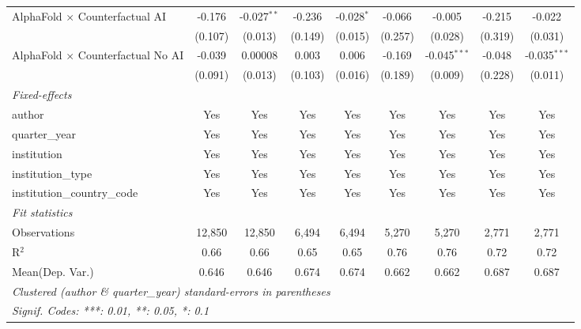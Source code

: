 \begin{tabular}{lcccccccc}
   AlphaFold $\times$ Counterfactual AI     & -0.176  & -0.027$^{**}$ & -0.236  & -0.028$^{*}$ & -0.066  & -0.005         & -0.215  & -0.022\\   
                                            & (0.107) & (0.013)       & (0.149) & (0.015)      & (0.257) & (0.028)        & (0.319) & (0.031)\\   
   AlphaFold $\times$ Counterfactual No AI  & -0.039  & 0.00008       & 0.003   & 0.006        & -0.169  & -0.045$^{***}$ & -0.048  & -0.035$^{***}$\\   
                                            & (0.091) & (0.013)       & (0.103) & (0.016)      & (0.189) & (0.009)        & (0.228) & (0.011)\\   
   \midrule
   \emph{Fixed-effects}\\
   author                                   & Yes     & Yes           & Yes     & Yes          & Yes     & Yes            & Yes     & Yes\\  
   quarter\_year                            & Yes     & Yes           & Yes     & Yes          & Yes     & Yes            & Yes     & Yes\\  
   institution                              & Yes     & Yes           & Yes     & Yes          & Yes     & Yes            & Yes     & Yes\\  
   institution\_type                        & Yes     & Yes           & Yes     & Yes          & Yes     & Yes            & Yes     & Yes\\  
   institution\_country\_code               & Yes     & Yes           & Yes     & Yes          & Yes     & Yes            & Yes     & Yes\\  
   \midrule
   \emph{Fit statistics}\\
   Observations                             & 12,850  & 12,850        & 6,494   & 6,494        & 5,270   & 5,270          & 2,771   & 2,771\\  
   R$^2$                                    & 0.66    & 0.66          & 0.65    & 0.65         & 0.76    & 0.76           & 0.72    & 0.72\\  
Mean(Dep. Var.) & 0.646 & 0.646 & 0.674 & 0.674 & 0.662 & 0.662 & 0.687 & 0.687 \\
   \midrule \midrule
   \multicolumn{9}{l}{\emph{Clustered (author \& quarter\_year) standard-errors in parentheses}}\\
   \multicolumn{9}{l}{\emph{Signif. Codes: ***: 0.01, **: 0.05, *: 0.1}}\\
\end{tabular}
\par\endgroup
